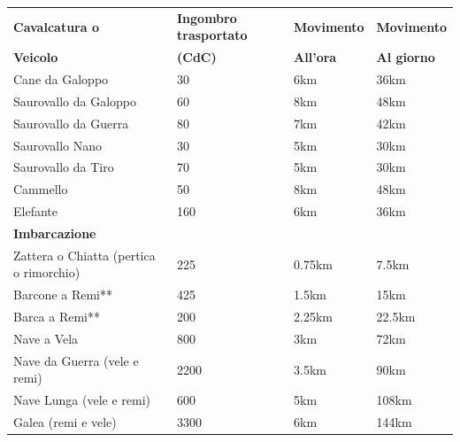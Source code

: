 \noindent\begin{tabularx}{\linewidth}{llXX}
	\toprule
\rowcolor{gray!20}\textbf{Cavalcatura o} & \textbf{Ingombro trasportato} & \textbf{Movimento} & \textbf{Movimento}\\
\textbf{Veicolo}&\textbf{(CdC)}&\textbf{All'ora} & \textbf{Al giorno}\\
\toprule
\rowcolor{gray!20}Cane da Galoppo & 30 & 6km & 36km \\
Saurovallo da Galoppo& 60& 8km & 48km \\
\rowcolor{gray!20}Saurovallo da Guerra & 80& 7km & 42km \\
Saurovallo Nano& 30& 5km & 30km \\
\rowcolor{gray!20}Saurovallo da Tiro& 70& 5km & 30km \\
Cammello& 50& 8km & 48km \\
\rowcolor{gray!20}Elefante& 160& 6km & 36km \\
\hline
\textbf{Imbarcazione} &&& \\
\hline
\rowcolor{gray!20}Zattera o Chiatta (pertica o rimorchio)& 225 & 0.75km & 7.5km \\
Barcone a Remi**& 425 & 1.5km& 15km\\
\rowcolor{gray!20}Barca a Remi**& 200 & 2.25km & 22.5km\\
Nave a Vela& 800 & 3km& 72km\\
\rowcolor{gray!20}Nave da Guerra (vele e remi) & 2200 & 3.5km & 90km\\
Nave Lunga (vele e remi)& 600& 5km& 108km \\
\rowcolor{gray!20}Galea (remi e vele) & 3300 & 6km& 144km
\end{tabularx}

